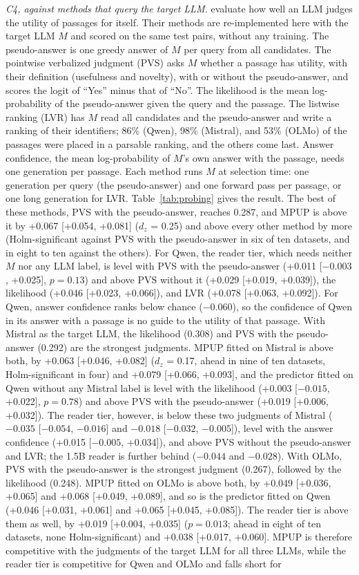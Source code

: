 \documentclass[preprint,12pt,authoryear]{elsarticle}
\begin{document}
\textit{C4, against methods that query the target LLM.} \citet{zhang2025c} evaluate how well an LLM judges the utility of passages for itself. Their methods are re-implemented here with the target LLM $M$ and scored on the same test pairs, without any training. The pseudo-answer is one greedy answer of $M$ per query from all candidates. The pointwise verbalized judgment (PVS) asks $M$ whether a passage has utility, with their definition (usefulness and novelty), with or without the pseudo-answer, and scores the logit of ``Yes'' minus that of ``No''. The likelihood is the mean log-probability of the pseudo-answer given the query and the passage. The listwise ranking (LVR) has $M$ read all candidates and the pseudo-answer and write a ranking of their identifiers; 86\% (Qwen), 98\% (Mistral), and 53\% (OLMo) of the passages were placed in a parsable ranking, and the others come last. Answer confidence, the mean log-probability of $M$'s own answer with the passage, needs one generation per passage. Each method runs $M$ at selection time: one generation per query (the pseudo-answer) and one forward pass per passage, or one long generation for LVR. Table~\ref{tab:probing} gives the result. The best of these methods, PVS with the pseudo-answer, reaches 0.287, and MPUP is above it by +0.067 [+0.054, +0.081] ($d_z$ = 0.25) and above every other method by more (Holm-significant against PVS with the pseudo-answer in six of ten datasets, and in eight to ten against the others). For Qwen, the reader tier, which needs neither $M$ nor any LLM label, is level with PVS with the pseudo-answer (+0.011 [$-0.003$, +0.025], $p = 0.13$) and above PVS without it (+0.029 [+0.019, +0.039]), the likelihood (+0.046 [+0.023, +0.066]), and LVR (+0.078 [+0.063, +0.092]). For Qwen, answer confidence ranks below chance ($-0.060$), so the confidence of Qwen in its answer with a passage is no guide to the utility of that passage. With Mistral as the target LLM, the likelihood (0.308) and PVS with the pseudo-answer (0.292) are the strongest judgments. MPUP fitted on Mistral is above both, by +0.063 [+0.046, +0.082] ($d_z$ = 0.17, ahead in nine of ten datasets, Holm-significant in four) and +0.079 [+0.066, +0.093], and the predictor fitted on Qwen without any Mistral label is level with the likelihood (+0.003 [$-0.015$, +0.022], $p = 0.78$) and above PVS with the pseudo-answer (+0.019 [+0.006, +0.032]). The reader tier, however, is below these two judgments of Mistral ($-0.035$ [$-0.054$, $-0.016$] and $-0.018$ [$-0.032$, $-0.005$]), level with the answer confidence (+0.015 [$-0.005$, +0.034]), and above PVS without the pseudo-answer and LVR; the 1.5B reader is further behind ($-0.044$ and $-0.028$). With OLMo, PVS with the pseudo-answer is the strongest judgment (0.267), followed by the likelihood (0.248). MPUP fitted on OLMo is above both, by +0.049 [+0.036, +0.065] and +0.068 [+0.049, +0.089], and so is the predictor fitted on Qwen (+0.046 [+0.031, +0.061] and +0.065 [+0.045, +0.085]). The reader tier is above them as well, by +0.019 [+0.004, +0.035] ($p = 0.013$; ahead in eight of ten datasets, none Holm-significant) and +0.038 [+0.017, +0.060]. MPUP is therefore competitive with the judgments of the target LLM for all three LLMs, while the reader tier is competitive for Qwen and OLMo and falls short for 
\end{document}
